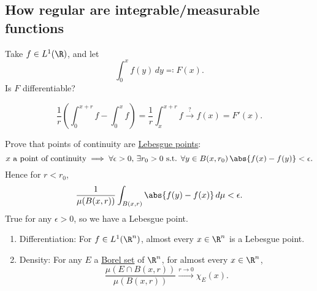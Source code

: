 \documentclass[twoside]{article}
\begin{document}
\clearpage
\subsection{How regular are integrable/measurable functions}
Take $f \in L^1(\R)$, and let
\begin{equation*}
    \int_0^x f(y) \, dy \eqqcolon F(x).
\end{equation*}
Is $F$ differentiable?
\begin{remark}
    \begin{equation*}
        \frac{1}{r} \left(\int_0^{x+r} f - \int_0^x f\right) = \frac{1}{r} \int_x^{x+r} f \xrightarrow{?} f(x) = F'(x).
    \end{equation*}
\end{remark}
\begin{ex}
    Prove that points of continuity are \hyperlink{def:lebPoint}{Lebesgue points}:
    \begin{equation*}
        x \text{ a point of continuity} \implies \forall \epsilon > 0, \, \exists r_0 > 0 \text{ s.t. } \forall y \in B(x, r_0) \, \abs{f(x) - f(y)} < \epsilon.
    \end{equation*}
    Hence for $r < r_0$,
    \begin{equation*}
        \frac{1}{\mu(B(x, r))} \int_{B(x,r)} \abs{f(y) - f(x)} \, d\mu < \epsilon.
    \end{equation*}
    True for any $\epsilon>0$, so we have a Lebesgue point.
\end{ex}
\begin{thm}\leavevmode
    \begin{enumerate}[label=(\arabic*)]
        \item Differentiation: For $f \in L^1(\R^n)$, almost every $x \in \R^n$ is a Lebesgue point.
        \item Density: For any $E$ a \hyperlink{def:borelSet}{Borel set} of $\R^n$, for almost every $x \in \R^n$,
            \begin{equation*}
                \frac{\mu(E \cap B(x, r))}{\mu(B(x, r))} \xrightarrow{r \to 0} \chi_E(x). \label{1.4star} \tag{$*$}
            \end{equation*}
    \end{enumerate}
\end{thm}
\end{document}
